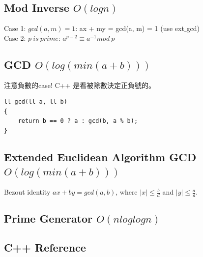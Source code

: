 \documentclass[10pt,oneside]{article}
\begin{document}
\begin{landscape}
\begin{multicols}{2}

\subsection{Mod Inverse $ O(log n) $}

{\normalsize 
Case 1: $gcd(a, m) = 1$:  ax + my = gcd(a, m) = 1 (use ext$\_$gcd) \\

\noindent Case 2: $p\ is\ prime$: $a^{p - 2} \equiv a^{-1} mod\ p$ 
}

\subsection{GCD $O(log( min(a + b) ))$}

{\large 注意負數的case! C++ 是看被除數決定正負號的。}

\begin{verbatim}
ll gcd(ll a, ll b)
{
    return b == 0 ? a : gcd(b, a % b);
}
\end{verbatim}

\subsection{Extended Euclidean Algorithm GCD $O(log( min(a + b) ))$}

{\normalsize 
Bezout identity $ax + by = gcd(a, b)$, where $\mid x \mid \leq \frac b d$ and $\mid y \mid \leq \frac a d$.
}


\subsection{Prime Generator $ O(n loglogn) $}

\subsection{C++ Reference}





\end{multicols}
\end{landscape}
\end{document}
